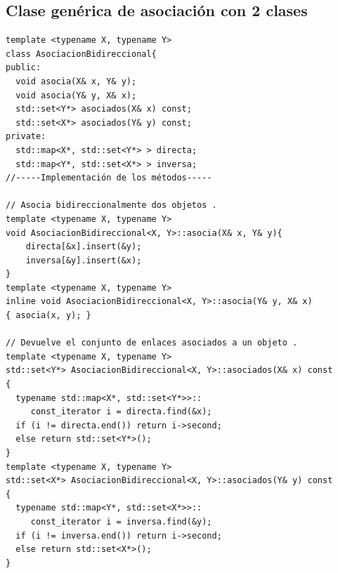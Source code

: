 \subsection{Clase genérica de asociación con 2 clases}
\begin{center}
	\begin{lstlisting}[frame=single]
template <typename X, typename Y>
class AsociacionBidireccional{
public:
  void asocia(X& x, Y& y);
  void asocia(Y& y, X& x);
  std::set<Y*> asociados(X& x) const;
  std::set<X*> asociados(Y& y) const;
private:
  std::map<X*, std::set<Y*> > directa;
  std::map<Y*, std::set<X*> > inversa;
//-----Implementación de los métodos-----

// Asocia bidireccionalmente dos objetos .
template <typename X, typename Y>
void AsociacionBidireccional<X, Y>::asocia(X& x, Y& y){
    directa[&x].insert(&y);
    inversa[&y].insert(&x);
}
template <typename X, typename Y>
inline void AsociacionBidireccional<X, Y>::asocia(Y& y, X& x)
{ asocia(x, y); }

// Devuelve el conjunto de enlaces asociados a un objeto .
template <typename X, typename Y>
std::set<Y*> AsociacionBidireccional<X, Y>::asociados(X& x) const
{
  typename std::map<X*, std::set<Y*>>::
     const_iterator i = directa.find(&x);
  if (i != directa.end()) return i->second;
  else return std::set<Y*>();
}
template <typename X, typename Y>
std::set<X*> AsociacionBidireccional<X, Y>::asociados(Y& y) const
{
  typename std::map<Y*, std::set<X*>>::
     const_iterator i = inversa.find(&y);
  if (i != inversa.end()) return i->second;
  else return std::set<X*>();
}
\end{lstlisting}
\end{center}
\newpage
